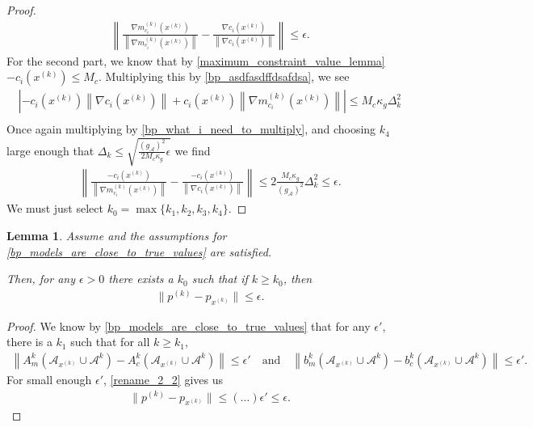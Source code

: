 \documentclass{article}
\newtheorem{lemma}[theorem]{Lemma}
\theoremstyle{case}
\newcommand{\dk}{\Delta_k}
\newcommand{\gmcik}{{\nabla m_{c_i}^{(k)}\left(\xk\right)}}
\newcommand{\minactivegrad}{{ g_{\mathcal A} }}
\newcommand{\xk}{{x^{(k)}}}
\begin{document}
\begin{proof}
\begin{align*}
\left\|\frac{\gmcik}{\left\|\gmcik\right\|} - \frac{\nabla c_i\left(\xk\right)}{\left\|\nabla c_i\left(\xk \right)\right\|} \right\| \le \epsilon.
\end{align*}
For the second part, we know that by 
\cref{maximum_constraint_value_lemma}
$-c_i\left(\xk\right) \le M_c$.
Multiplying this by \cref{bp_asdfasdffdsafdsa}, we see
\begin{align*}
\left|-c_i\left(\xk\right)\left\|\nabla c_i\left(\xk \right)\right\| + c_i\left(\xk\right)\left\|\gmcik\right\|\right| \le M_c \kappa_g \dk^2 \\
\end{align*}
Once again multiplying by \cref{bp_what_i_need_to_multiply}, and choosing $k_4$ large enough that 
$\dk \le \sqrt{\frac{\left(\minactivegrad\right)^2}{2M_c \kappa_g} \epsilon}$
we find
\begin{align*}
\left\|\frac{-c_i\left(\xk \right)}{\left\|\gmcik\right\|} - \frac{-c_i\left(\xk \right)}{\left\|\nabla c_i\left(\xk \right)\right\|} \right\|
\le 2\frac{M_c \kappa_g}{\left(\minactivegrad\right)^2} \dk^2
\le \epsilon.
\end{align*}
We must just select $k_0 = \max\{k_1, k_2, k_3, k_4\}$.
\end{proof}


\begin{lemma}
\label{bp_first_application_of_2_2}
Assume 
and the assumptions for
\cref{bp_models_are_close_to_true_values}
are satisfied.

Then, for any $\epsilon > 0$ there exists a $k_0$ such that if $k \ge k_0$, then
\begin{align*}
\| p^{(k)} - p_{\xk} \| \le \epsilon.
\end{align*}
\end{lemma}
\begin{proof}
We know by \cref{bp_models_are_close_to_true_values} that for any $\epsilon'$, there is a $k_1$ such that for all $k \ge k_1$,
\begin{align*}
\left\|A^k_m\left(\mathcal A_{\xk} \cup \mathcal A^{k}\right) - A^k_c\left(\mathcal A_{\xk} \cup \mathcal A^{k}\right)\right\| \le \epsilon'
\quad \textrm{and} \quad \left\|b^k_m\left(\mathcal A_{\xk} \cup \mathcal A^{k}\right) - b^k_c\left(\mathcal A_{\xk} \cup \mathcal A^{k}\right)\right\| \le \epsilon'.
\end{align*}
For small enough $\epsilon'$, \cref{rename_2_2} gives us
\begin{align*}
\| p^{(k)} - p_{\xk} \| \le \left(\ldots\right) \epsilon' \le \epsilon.
\end{align*}
\end{proof}
\end{document}
